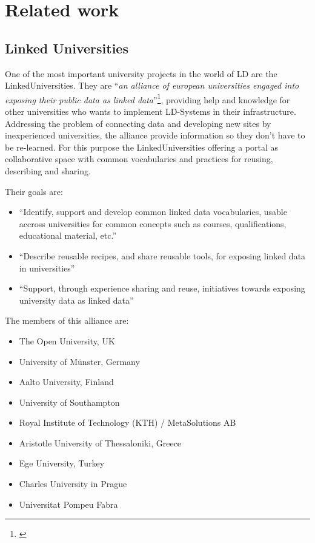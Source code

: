\section{Related work}
\subsection{Linked Universities}
One of the most important university projects in the world of LD are the LinkedUniversities. They are "`\textit{an alliance of european universities engaged into exposing their public data as linked data}"'\footnote{\cite{url:linkeduniversities}}, providing help and knowledge for other universities who wants to implement LD-Systems in their infrastructure. Addressing the problem of connecting data and developing new sites by inexperienced universities, the alliance provide information so they don't have to be re-learned. For this purpose the LinkedUniversities offering a portal as collaborative space with common vocabularies and practices for reusing, describing and sharing.

Their goals are:\cite{url:linkeduniversities}

\begin{itemize}
\item "`Identify, support and develop common linked data vocabularies, usable accross universities for common concepts such as courses, qualifications, educational material, etc."'
\item "`Describe reusable recipes, and share reusable tools, for exposing linked data in universities"'
\item "`Support, through experience sharing and reuse, initiatives towards exposing university data as linked data"'
\end{itemize}


The members of this alliance are:\cite{url:linked-universities-members}
\begin{itemize}
	\item The Open University, UK
	\item University of Münster, Germany
	\item Aalto University, Finland
	\item University of Southampton
	\item Royal Institute of Technology (KTH) / MetaSolutions AB
	\item Aristotle University of Thessaloniki, Greece
	\item Ege University, Turkey
	\item Charles University in Prague
	\item Universitat Pompeu Fabra
\end{itemize}

